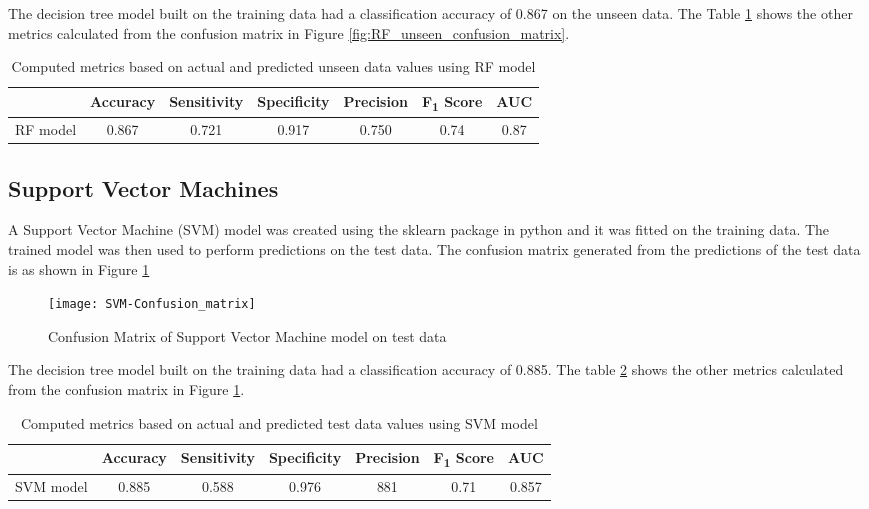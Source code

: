 \documentclass[11pt,openright]{report}
\begin{document}
The decision tree model built on the training data had a classification accuracy of 0.867 on the unseen data. The Table \ref{table:RF-unseen_metrics_db} shows the other metrics calculated from the confusion matrix in Figure \ref{fig:RF_unseen_confusion_matrix}.

\begin{table}[!htb]
	\renewcommand{\arraystretch}{1.3}
	\caption{Computed metrics based on actual and predicted unseen data values using RF model}
	\label{table:RF-unseen_metrics_db}
	\centering
	\begin{tabular}{|c|c|c|c|c|c|c|}
    \hline
  	 & \bfseries Accuracy & \bfseries Sensitivity & \bfseries Specificity & \bfseries Precision & \bfseries F\textsubscript{1} Score  & \bfseries AUC\\  
    \hline
	RF model & 0.867 & 0.721 & 0.917 & 0.750 & 0.74 & 0.87 \\ \hline
	\end{tabular} 
\end{table}


\subsection {Support Vector Machines}
A Support Vector Machine (SVM) model was created using the sklearn package in python and it was fitted on the training data. The trained model was then used to perform predictions on the test data. The confusion matrix generated from the predictions of the test data is as shown in Figure \ref{fig:SVM_confusion_matrix}

  \begin{figure}[!htb]
	\centering
	\texttt{[image: SVM-Confusion\_matrix]}
	\caption{Confusion Matrix of Support Vector Machine model on test data}
	\label{fig:SVM_confusion_matrix}
\end{figure} 

The decision tree model built on the training data had a classification accuracy of 0.885. The table \ref{table:SVM_confusion_matrix} shows the other metrics calculated from the confusion matrix in Figure \ref{fig:SVM_confusion_matrix}. 
\begin{table} [!htb]
	\renewcommand{\arraystretch}{1.3}
	\caption{Computed metrics based on actual and predicted test data values using SVM model}
	\label{table:SVM_confusion_matrix}
	\centering
	\begin{tabular}{|c|c|c|c|c|c|c|}
    \hline
  	 & \bfseries Accuracy & \bfseries Sensitivity & \bfseries Specificity & \bfseries Precision & \bfseries F\textsubscript{1} Score  & \bfseries AUC\\  
    \hline
	SVM model & 0.885 & 0.588 & 0.976 & 881 & 0.71 & 0.857 \\ \hline
	\end{tabular} 
\end{table}
\end{document}
